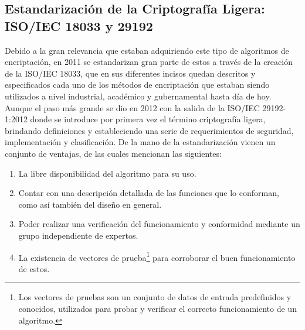 \documentclass[a4paper,10pt]{article}
\begin{document}
	\subsection{Estandarización de la Criptografía Ligera: ISO/IEC 18033 y 29192}
	Debido a la gran relevancia que estaban adquiriendo este tipo de algoritmos de encriptación, en 2011 se estandarizan gran parte de estos a través de la creación de la ISO/IEC 18033, que en sus diferentes incisos quedan descritos y especificados cada uno de los métodos de encriptación que estaban siendo utilizados a nivel industrial, académico y gubernamental hasta día de hoy. Aunque el paso más grande se dio en 2012 con la salida de la ISO/IEC 29192-1:2012 donde se introduce por primera vez el término criptografía ligera, brindando definiciones y estableciendo una serie de requerimientos de seguridad, implementación y clasificación. De la mano de la estandarización vienen un conjunto de ventajas, de las cuales \textcite{eterovic15stream} mencionan las siguientes:
	\begin{enumerate}
		\item La libre disponibilidad del algoritmo para su uso. 
		\item Contar con una descripción detallada de las funciones que lo conforman, como así también del diseño en general. 
		\item Poder realizar una verificación del funcionamiento y conformidad mediante un grupo independiente de expertos. 
		\item La existencia de vectores de prueba\footnote{Los vectores de pruebas son un conjunto de datos de entrada predefinidos y conocidos, utilizados para probar y verificar el correcto funcionamiento de un algoritmo.} para corroborar el buen funcionamiento de estos.
	\end{enumerate}
\end{document}
